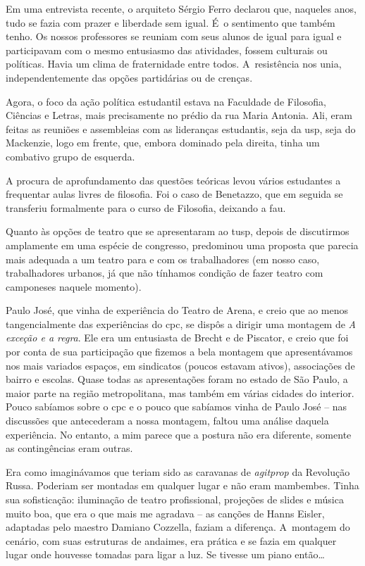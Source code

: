 {Em uma entrevista recente, o arquiteto Sérgio Ferro declarou que,
naqueles anos, tudo se fazia com prazer e liberdade sem igual. É~o
sentimento que também tenho. Os nossos professores se reuniam com seus
alunos de igual para igual e participavam com o mesmo entusiasmo das
atividades, fossem culturais ou políticas. Havia um clima de
fraternidade entre todos. A~resistência nos unia, independentemente das
opções partidárias ou de crenças.

Agora, o foco da ação política estudantil estava na Faculdade de
Filosofia, Ciências e Letras, mais precisamente no prédio da rua Maria
Antonia. Ali, eram feitas as reuniões e assembleias com as
lideranças estudantis, seja da {\sc usp}, seja do Mackenzie, logo em frente, que,
embora dominado pela direita, tinha um combativo grupo de esquerda.

A procura de aprofundamento das questões teóricas levou vários
estudantes a frequentar aulas livres de filosofia. Foi o caso de
Benetazzo, que em seguida se transferiu formalmente para o curso de Filosofia,
deixando a {\sc fau}.

Quanto às opções de teatro que se apresentaram ao {\sc tusp}, depois de
discutirmos amplamente em uma espécie de congresso,
predominou uma proposta que parecia mais adequada a um teatro para e com
os trabalhadores (em nosso caso, trabalhadores urbanos, já que não
tínhamos condição de fazer teatro com camponeses naquele momento).

Paulo José, que vinha de experiência do Teatro de Arena, e creio que ao
menos tangencialmente das experiências do {\sc cpc}, se dispôs a dirigir uma
montagem de {\it A exceção e a regra}. Ele era um entusiasta de Brecht e
de Piscator, e creio que foi por conta de sua participação que fizemos a bela
montagem que apresentávamos nos mais variados
espaços, em sindicatos (poucos estavam ativos), associações de bairro e
escolas. Quase todas as apresentações foram no estado de São Paulo, a
maior parte na região metropolitana, mas também em várias cidades do
interior. Pouco sabíamos sobre o {\sc cpc} e o pouco que sabíamos vinha de
Paulo José -- nas discussões que antecederam a nossa montagem, faltou uma
análise daquela experiência. No entanto, a mim parece que a postura não
era diferente, somente as contingências eram outras.

Era como imaginávamos que teriam sido as caravanas de {\it agitprop} da
Revolução Russa. Poderiam ser montadas em qualquer lugar e não eram
mambembes. Tinha sua sofisticação: iluminação de teatro profissional,
projeções de slides e música muito boa, que era o que mais me agradava -- as
canções de Hanns Eisler, adaptadas pelo maestro Damiano Cozzella, faziam a
diferença. A~montagem do cenário, com suas estruturas de andaimes, era
prática e se fazia em qualquer lugar onde houvesse tomadas para ligar a
luz. Se tivesse um piano então\ldots{}

}
